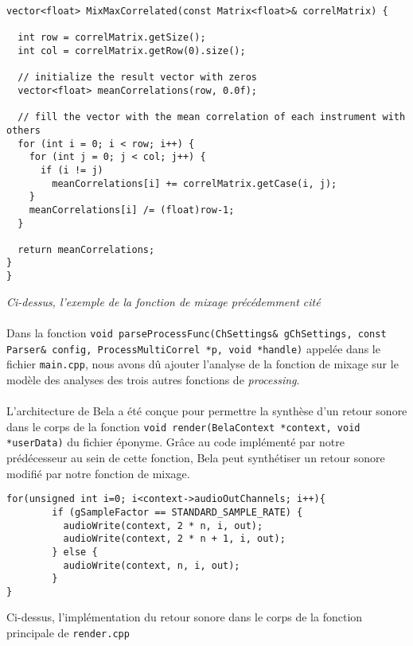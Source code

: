 \begin{lstlisting}
vector<float> MixMaxCorrelated(const Matrix<float>& correlMatrix) {

  int row = correlMatrix.getSize();
  int col = correlMatrix.getRow(0).size();

  // initialize the result vector with zeros
  vector<float> meanCorrelations(row, 0.0f);

  // fill the vector with the mean correlation of each instrument with others
  for (int i = 0; i < row; i++) {
    for (int j = 0; j < col; j++) {
      if (i != j)
        meanCorrelations[i] += correlMatrix.getCase(i, j);
    }
    meanCorrelations[i] /= (float)row-1;
  }

  return meanCorrelations;
}
}
\end{lstlisting}

\begin{center}
\textit{Ci-dessus, l'exemple de la fonction de mixage précédemment cité}
  \end{center}

\paragraph{}
Dans la fonction
\verb!void parseProcessFunc(ChSettings& gChSettings, const Parser& config, ProcessMultiCorrel *p, void *handle)!
appelée dans le fichier \verb!main.cpp!, nous avons dû ajouter
l'analyse de la fonction de mixage sur le modèle des analyses des
trois autres fonctions de \textit{processing}.

\paragraph{}
L'architecture de Bela a été conçue pour permettre la synthèse d'un
retour sonore dans le corps de la fonction
\verb!void render(BelaContext *context, void *userData)! du fichier
éponyme. Grâce au code implémenté par notre prédécesseur au sein de
cette fonction, Bela peut synthétiser un retour sonore modifié par
notre fonction de mixage.

\begin{lstlisting}
for(unsigned int i=0; i<context->audioOutChannels; i++){
  	    if (gSampleFactor == STANDARD_SAMPLE_RATE) {
          audioWrite(context, 2 * n, i, out);
  	      audioWrite(context, 2 * n + 1, i, out);
  	    } else {
  	      audioWrite(context, n, i, out);
  	    }
}
\end{lstlisting}
\begin{center}
Ci-dessus, l'implémentation du retour sonore dans le corps de la fonction principale de \verb!render.cpp!
  \end{center}

